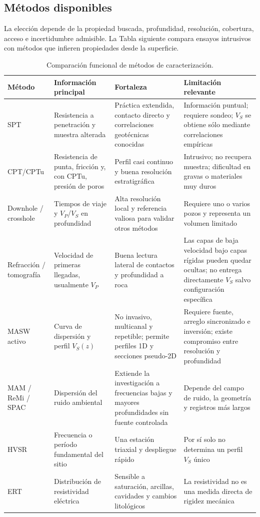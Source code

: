 \subsection{Métodos disponibles}

La elección depende de la propiedad buscada, profundidad, resolución, cobertura, acceso
e incertidumbre admisible. La Tabla siguiente compara ensayos intrusivos con métodos que
infieren propiedades desde la superficie.

\begin{table}[ht]
\centering
\footnotesize
\caption{Comparación funcional de métodos de caracterización.}
\begin{tabularx}{\textwidth}{@{}>{\raggedright\arraybackslash}p{} >{\raggedright\arraybackslash}p{} Y Y@{}}
\toprule
\textbf{Método} & \textbf{Información principal} & \textbf{Fortaleza} & \textbf{Limitación relevante} \\
\midrule
SPT & Resistencia a penetración y muestra alterada & Práctica extendida, contacto directo y correlaciones geotécnicas conocidas & Información puntual; requiere sondeo; $V_S$ se obtiene sólo mediante correlaciones empíricas \\
CPT/CPTu & Resistencia de punta, fricción y, con CPTu, presión de poros & Perfil casi continuo y buena resolución estratigráfica & Intrusivo; no recupera muestra; dificultad en gravas o materiales muy duros \\
Downhole / crosshole & Tiempos de viaje y $V_P$/$V_S$ en profundidad & Alta resolución local y referencia valiosa para validar otros métodos & Requiere uno o varios pozos y representa un volumen limitado \\
Refracción / tomografía & Velocidad de primeras llegadas, usualmente $V_P$ & Buena lectura lateral de contactos y profundidad a roca & Las capas de baja velocidad bajo capas rígidas pueden quedar ocultas; no entrega directamente $V_S$ salvo configuración específica \\
MASW activo & Curva de dispersión y perfil $V_S(z)$ & No invasivo, multicanal y repetible; permite perfiles 1D y secciones pseudo-2D & Requiere fuente, arreglo sincronizado e inversión; existe compromiso entre resolución y profundidad \\
MAM / ReMi / SPAC & Dispersión del ruido ambiental & Extiende la investigación a frecuencias bajas y mayores profundidades sin fuente controlada & Depende del campo de ruido, la geometría y registros más largos \\
HVSR & Frecuencia o período fundamental del sitio & Una estación triaxial y despliegue rápido & Por sí solo no determina un perfil $V_S$ único \\
ERT & Distribución de resistividad eléctrica & Sensible a saturación, arcillas, cavidades y cambios litológicos & La resistividad no es una medida directa de rigidez mecánica \\
\bottomrule
\end{tabularx}
\end{table}

